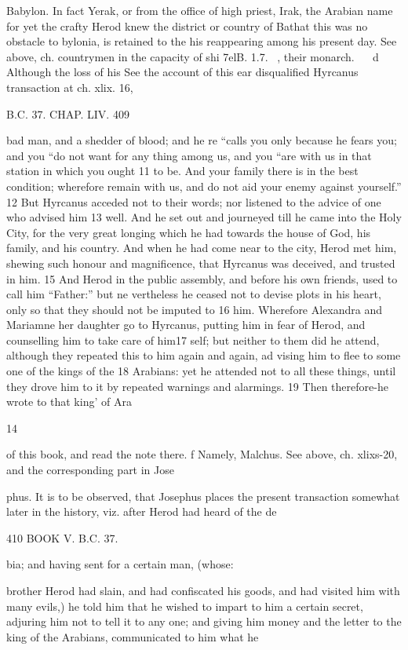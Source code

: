 Babylon. In fact Yerak, or from the office of high priest, Irak, the Arabian name for yet the crafty Herod knew the district or country of Bathat this was no obstacle to bylonia, is retained to the his reappearing among his present day. See above, ch. countrymen in the capacity of shi 7elB. 1.7. ~, their monarch. 
~~ d Although the loss of his See the account of this ear disqualified Hyrcanus transaction at ch. xlix. 16, 

B.C. 37. CHAP. LIV. 409 

 bad man, and a shedder of blood; and he re
“calls you only because he fears you; and you 
“do not want for any thing among us, and you 
“are with us in that station in which you ought 11 to be. And your family there is in the best 
 condition; wherefore remain with us, and do not 
 aid your enemy against yourself.” 12 But Hyrcanus acceded not to their words; nor 
listened to the advice of one who advised him 13 well. And he set out and journeyed till he came into the Holy City, for the very great longing which he had towards the house of God, his family, and his country. 
And when he had come near to the city, Herod met him, shewing such honour and magnificence, that Hyrcanus was deceived, and trusted in him. 15 And Herod in the public assembly, and before his 
own friends, used to call him “Father:” but ne
vertheless he ceased not to devise plots in his heart, only so that they should not be imputed to 16 him. Wherefore Alexandra and Mariamne her daughter go to Hyrcanus, putting him in fear of 
Herod, and counselling him to take care of him17 self; but neither to them did he attend, although 
they repeated this to him again and again, ad
vising him to flee to some one of the kings of the 18 Arabians: yet he attended not to all these things, until they drove him to it by repeated warnings and alarmings. 19 Then therefore-he wrote to that king’ of Ara

14 

of this book, and read the note there. 
f Namely, Malchus. See above, ch. xlixs-20, and the corresponding part in Jose

phus. It is to be observed, that Josephus places the present transaction somewhat later in the history, viz. after Herod had heard of the de

410 BOOK V. B.C. 37. 

bia; and having sent for a certain man, (whose: 

brother Herod had slain, and had confiscated his goods, and had visited him with many evils,) he told him that he wished to impart to him a certain secret, adjuring him not to tell it to any one; and giving him money and the letter to the king of the Arabians, communicated to him what he 

